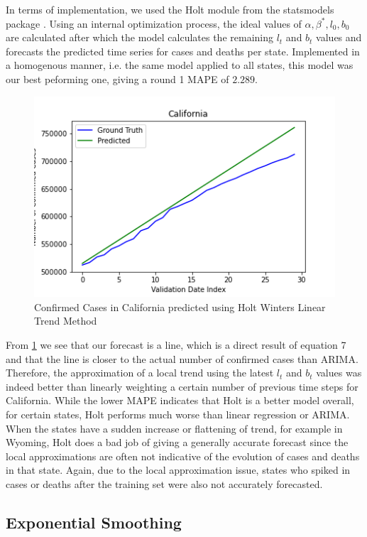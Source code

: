 \documentclass[sigconf,nonacm]{acmart}
\begin{document}
In terms of implementation, we used the Holt module from the statsmodels package \cite{statsmodels}. Using an internal optimization process,
the ideal values of $\alpha, \beta^*, l_0, b_0$ are calculated after which the model calculates the remaining $l_t$ and $b_t$ values
and forecasts the predicted time series for cases and deaths per state. Implemented in a homogenous manner, i.e. the same model applied 
to all states, this model was our best peforming one, giving a round 1 MAPE of $2.289$. 

\begin{figure}
  \includegraphics[width=\linewidth]{figures/HOLT_Cali_Conf.png}
  \caption{Confirmed Cases in California predicted using Holt Winters Linear Trend Method}
  \label{fig:HOLT}
\end{figure}
From \ref{fig:HOLT} we see that our forecast is a line, which is a direct result of equation 7 and that the line is closer to the actual number 
of confirmed cases than ARIMA. Therefore, the approximation of a local trend using the latest $l_t$ and $b_t$ values was indeed better than 
linearly weighting a certain number of previous time steps for California. While the lower MAPE indicates that Holt is a better model overall,
for certain states, Holt performs much worse than linear regression or ARIMA. When the states have a sudden increase or flattening of trend,
for example in Wyoming, Holt does a bad job of giving a generally accurate forecast since the local approximations are often not indicative of 
the evolution of cases and deaths in that state. Again, due to the local approximation issue, states who spiked in cases or deaths after the
training set were also not accurately forecasted.
\subsection{Exponential Smoothing}
\end{document}
